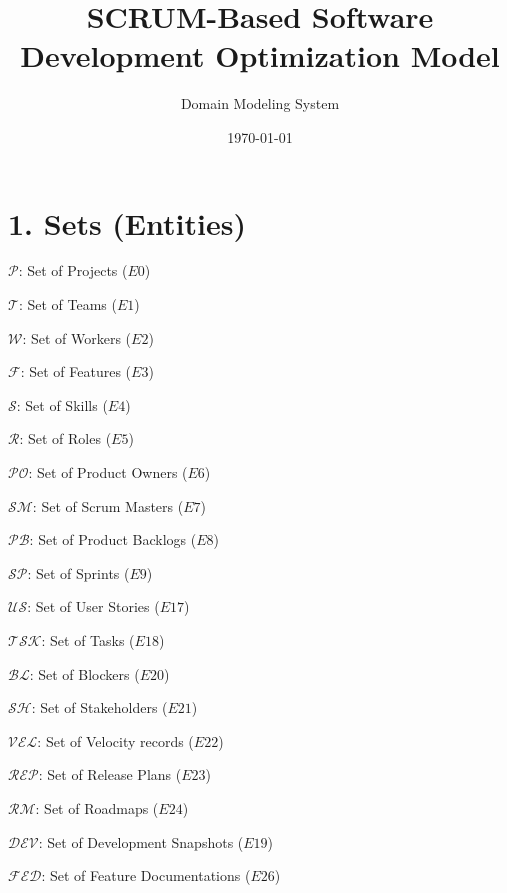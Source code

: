 \documentclass[12pt]{article}
\title{SCRUM-Based Software Development Optimization Model}
\author{Domain Modeling System}
\date{\today}
\begin{document}
\maketitle
\tableofcontents
\newpage

\section{1. Sets (Entities)}
\item $\mathcal{P}$: Set of Projects ($E0$)
    \item $\mathcal{T}$: Set of Teams ($E1$)
    \item $\mathcal{W}$: Set of Workers ($E2$)
    \item $\mathcal{F}$: Set of Features ($E3$)
    \item $\mathcal{S}$: Set of Skills ($E4$)
    \item $\mathcal{R}$: Set of Roles ($E5$)
    \item $\mathcal{PO}$: Set of Product Owners ($E6$)
    \item $\mathcal{SM}$: Set of Scrum Masters ($E7$)
    \item $\mathcal{PB}$: Set of Product Backlogs ($E8$)
    \item $\mathcal{SP}$: Set of Sprints ($E9$)
    \item $\mathcal{US}$: Set of User Stories ($E17$)
    \item $\mathcal{TSK}$: Set of Tasks ($E18$)
    \item $\mathcal{BL}$: Set of Blockers ($E20$)
    \item $\mathcal{SH}$: Set of Stakeholders ($E21$)
    \item $\mathcal{VEL}$: Set of Velocity records ($E22$)
    \item $\mathcal{REP}$: Set of Release Plans ($E23$)
    \item $\mathcal{RM}$: Set of Roadmaps ($E24$)
    \item $\mathcal{DEV}$: Set of Development Snapshots ($E19$)
    \item $\mathcal{FED}$: Set of Feature Documentations ($E26$)
\end{document}
